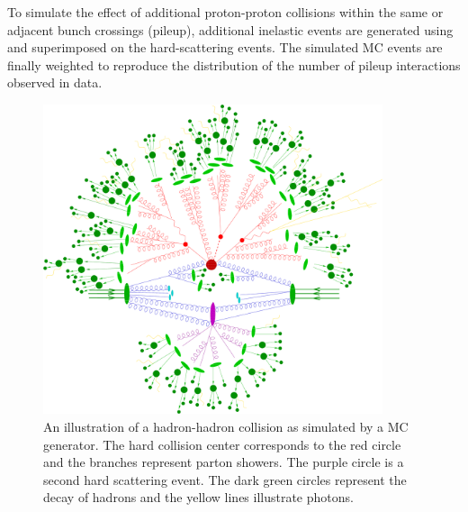 To simulate the effect of additional proton-proton collisions within the same or adjacent bunch crossings (pileup), additional inelastic events are generated using \PYTHIA and superimposed on the hard-scattering events. The simulated MC events are finally weighted to reproduce the distribution of the number of pileup interactions observed in data.
\begin{figure}[h!] 
    \centering 
    \includegraphics[width=0.89\textwidth]{figures/event_reconstruction/MCgen.png}
     \caption{An illustration of a hadron-hadron collision as simulated by a  MC generator. The hard collision center corresponds to the red circle and the branches represent parton showers. The purple circle is a second hard scattering event. The dark green circles represent the decay of hadrons and the yellow lines illustrate photons.}
     \label{fig:objreco:mcgen}
 \end{figure}
 